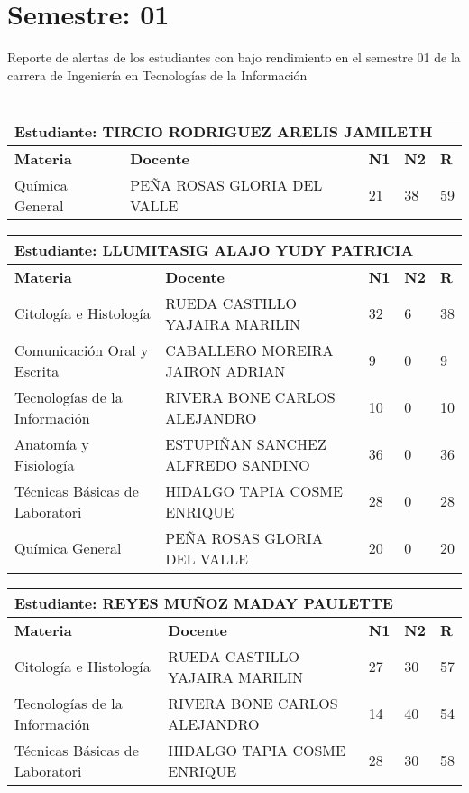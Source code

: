 \section{Semestre: 01}
        Reporte de alertas de los estudiantes con bajo rendimiento en el semestre 01 de la carrera de 
        Ingeniería en Tecnologías de la Información\\\\\small
\begin{tabularx}{\textwidth}{|p{5cm}|p{7cm}|X|X|X|}
\hline
\multicolumn{5}{|p{\dimexpr\textwidth-2\tabcolsep-2\arrayrulewidth}|}{\textbf{Estudiante: TIRCIO RODRIGUEZ ARELIS JAMILETH }}\\\hline
\textbf{Materia} & \textbf{Docente} & \textbf{N1} & \textbf{N2} & \textbf{R} \\ \hline
Química General & PEÑA ROSAS GLORIA DEL VALLE  & 21 & 38& 59 \\ \hline
\end{tabularx}\vspace{10mm}
\small
\begin{tabularx}{\textwidth}{|p{5cm}|p{7cm}|X|X|X|}
\hline
\multicolumn{5}{|p{\dimexpr\textwidth-2\tabcolsep-2\arrayrulewidth}|}{\textbf{Estudiante: LLUMITASIG ALAJO YUDY PATRICIA }}\\\hline
\textbf{Materia} & \textbf{Docente} & \textbf{N1} & \textbf{N2} & \textbf{R} \\ \hline
Citología e Histología & RUEDA CASTILLO YAJAIRA MARILIN  & 32 & 6& 38 \\ \hline
Comunicación Oral y Escrita & CABALLERO MOREIRA JAIRON ADRIAN  & 9 & 0& 9 \\ \hline
Tecnologías de la Información  & RIVERA BONE CARLOS ALEJANDRO  & 10 & 0& 10 \\ \hline
Anatomía y Fisiología & ESTUPIÑAN SANCHEZ ALFREDO SANDINO  & 36 & 0& 36 \\ \hline
Técnicas Básicas de Laboratori & HIDALGO TAPIA COSME ENRIQUE  & 28 & 0& 28 \\ \hline
Química General & PEÑA ROSAS GLORIA DEL VALLE  & 20 & 0& 20 \\ \hline
\end{tabularx}\vspace{10mm}
\small
\begin{tabularx}{\textwidth}{|p{5cm}|p{7cm}|X|X|X|}
\hline
\multicolumn{5}{|p{\dimexpr\textwidth-2\tabcolsep-2\arrayrulewidth}|}{\textbf{Estudiante: REYES MUÑOZ MADAY PAULETTE }}\\\hline
\textbf{Materia} & \textbf{Docente} & \textbf{N1} & \textbf{N2} & \textbf{R} \\ \hline
Citología e Histología & RUEDA CASTILLO YAJAIRA MARILIN  & 27 & 30& 57 \\ \hline
Tecnologías de la Información  & RIVERA BONE CARLOS ALEJANDRO  & 14 & 40& 54 \\ \hline
Técnicas Básicas de Laboratori & HIDALGO TAPIA COSME ENRIQUE  & 28 & 30& 58 \\ \hline
\end{tabularx}\vspace{10mm}
